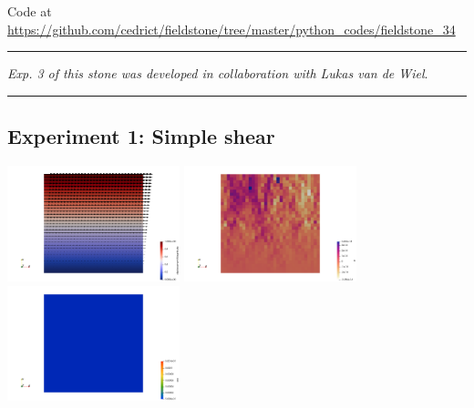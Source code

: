 

\begin{center}
Code at \url{https://github.com/cedrict/fieldstone/tree/master/python_codes/fieldstone_34}
\end{center}

\par\noindent\rule{\textwidth}{0.4pt}

{\sl Exp. 3 of this stone was developed in collaboration with Lukas van de Wiel}.

\par\noindent\rule{\textwidth}{0.4pt}

\subsection*{Experiment 1: Simple shear}

\begin{center}
\includegraphics[width=5cm]{python_codes/fieldstone_34/results/exp1/disp}
\includegraphics[width=5cm]{python_codes/fieldstone_34/results/exp1/p}
\includegraphics[width=5cm]{python_codes/fieldstone_34/results/exp1/exy}
\end{center}


